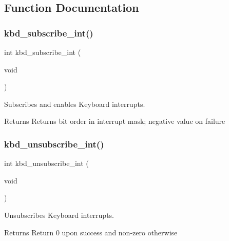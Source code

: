 \subsection{Function Documentation}
\hypertarget{group__keyboard_gafba3a35bd6a79305e84ab4f33a5ffa7f}{}\label{group__keyboard_gafba3a35bd6a79305e84ab4f33a5ffa7f} 
\subsubsection{\texorpdfstring{kbd\+\_\+subscribe\+\_\+int()}{kbd\_subscribe\_int()}}
{\footnotesize\ttfamily int kbd\+\_\+subscribe\+\_\+int (\begin{DoxyParamCaption}\item[{void}]{ }\end{DoxyParamCaption})}



Subscribes and enables Keyboard interrupts. 

\begin{DoxyReturn}{Returns}
Returns bit order in interrupt mask; negative value on failure 
\end{DoxyReturn}
\hypertarget{group__keyboard_ga162d7647d3af99ebea80b15778ce5b5d}{}\label{group__keyboard_ga162d7647d3af99ebea80b15778ce5b5d} 
\subsubsection{\texorpdfstring{kbd\+\_\+unsubscribe\+\_\+int()}{kbd\_unsubscribe\_int()}}
{\footnotesize\ttfamily int kbd\+\_\+unsubscribe\+\_\+int (\begin{DoxyParamCaption}\item[{void}]{ }\end{DoxyParamCaption})}



Unsubscribes Keyboard interrupts. 

\begin{DoxyReturn}{Returns}
Return 0 upon success and non-\/zero otherwise 
\end{DoxyReturn}
\hypertarget{group__keyboard_gacd2bc10465c70dbb99210f880bc18207}{}\label{group__keyboard_gacd2bc10465c70dbb99210f880bc18207} 
